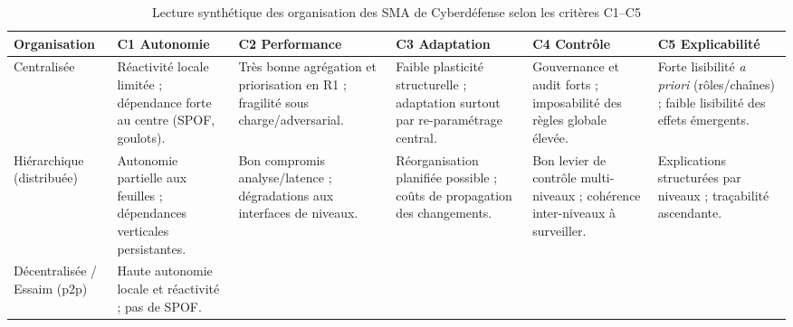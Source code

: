 \begin{table}[h!]
  \centering
  \caption{Lecture synthétique des organisation des SMA de Cyberdéfense selon les critères C1--C5}
  \label{tab:org-vs-criteria}
  \tiny
  \renewcommand{\arraystretch}{1.12}
  \begin{tabularx}{\linewidth}{
      >{\raggedright\arraybackslash\hsize=0.15\hsize}X
      >{\raggedright\arraybackslash\hsize=0.15\hsize}X
      >{\raggedright\arraybackslash\hsize=0.15\hsize}X
      >{\raggedright\arraybackslash\hsize=0.15\hsize}X
      >{\raggedright\arraybackslash\hsize=0.15\hsize}X
      >{\raggedright\arraybackslash\hsize=0.15\hsize}X}
    \toprule
    \textbf{Organisation}                                                                    & \textbf{C1 Autonomie} & \textbf{C2 Performance} & \textbf{C3 Adaptation} & \textbf{C4 Contrôle} & \textbf{C5 Explicabilité} \\
    \midrule
    Centralisée                                                                              &
    Réactivité locale limitée ; dépendance forte au centre (SPOF, goulots).                  &
    Très bonne agrégation et priorisation en R1 ; fragilité sous charge/adversarial.         &
    Faible plasticité structurelle ; adaptation surtout par re-paramétrage central.          &
    Gouvernance et audit forts ; imposabilité des règles globale élevée.                     &
    Forte lisibilité \emph{a priori} (rôles/chaînes) ; faible lisibilité des effets émergents.                                                                                                                             \\
    \addlinespace[2pt]
    Hiérarchique (distribuée)                                                                &
    Autonomie partielle aux feuilles ; dépendances verticales persistantes.                  &
    Bon compromis analyse/latence ; dégradations aux interfaces de niveaux.                  &
    Réorganisation planifiée possible ; coûts de propagation des changements.                &
    Bon levier de contrôle multi-niveaux ; cohérence inter-niveaux à surveiller.             &
    Explications structurées par niveaux ; traçabilité ascendante.                                                                                                                                                         \\
    \addlinespace[2pt]
    Décentralisée / Essaim (p2p)                                                             &
    Haute autonomie locale et réactivité ; pas de SPOF.                                      &

\end{tabularx}
\end{table}
